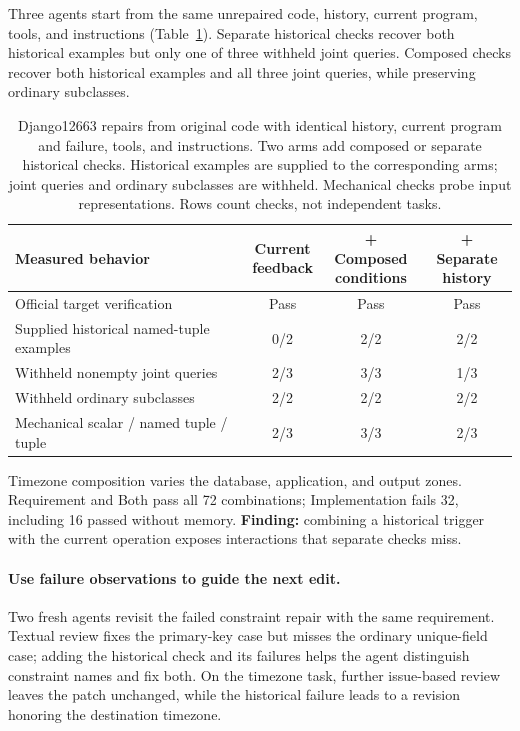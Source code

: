 Three agents start from the same unrepaired code, history, current program,
tools, and instructions (Table~\ref{tab:composedconditions}). Separate
historical checks recover both historical examples but only one of three
withheld joint queries. Composed checks recover both historical examples
and all three joint queries, while preserving ordinary subclasses.

\begin{table}[!htbp]
\centering
\caption{Django12663 repairs from original code with identical history,
current program and failure, tools, and instructions. Two arms add composed
or separate historical checks. Historical examples are supplied to the corresponding arms; joint queries and ordinary subclasses are withheld. Mechanical checks probe input representations. Rows count checks, not independent tasks.}
\label{tab:composedconditions}
\begin{tabular*}{\linewidth}{@{}l@{\extracolsep{\fill}}ccc@{}}
\toprule
Measured behavior & \shortstack{Current\\feedback} & \shortstack{+ Composed\\conditions}  & \shortstack{+ Separate\\history} \\
\midrule
Official target verification & Pass & Pass & Pass \\
Supplied historical named-tuple examples & 0/2 & 2/2 & 2/2 \\
Withheld nonempty joint queries & 2/3 & 3/3 & 1/3 \\
Withheld ordinary subclasses & 2/2 & 2/2 & 2/2 \\
Mechanical scalar / named tuple / tuple & 2/3 & 3/3 & 2/3 \\
\bottomrule
\end{tabular*}
\end{table}

Timezone composition varies the database, application, and output zones.
Requirement and Both pass all 72 combinations; Implementation fails 32,
including 16 passed without memory.
\textbf{Finding:} combining a historical trigger with the current operation
exposes interactions that separate checks miss.

\paragraph{Use failure observations to guide the next edit.}
\label{sec:feedback-results}
Two fresh agents revisit the failed constraint repair with the same
requirement. Textual review fixes the primary-key case but misses the ordinary
unique-field case; adding the historical check and its failures helps the
agent distinguish constraint names and fix both. On the timezone task,
further issue-based review leaves the patch unchanged, while the historical
failure leads to a revision honoring the destination timezone.

